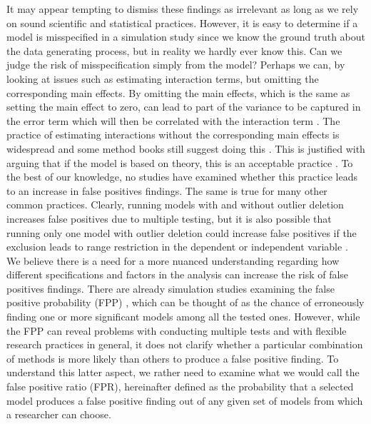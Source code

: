 It may appear tempting to dismiss these findings as irrelevant as long as we rely on sound scientific and statistical practices. However, it is easy to determine if a model is misspecified in a simulation study since we know the ground truth about the data generating process, but in reality we hardly ever know this. Can we judge the risk of misspecification simply from the model? Perhaps we can, by looking at issues such as estimating interaction terms, but omitting the corresponding main effects. By omitting the main effects, which is the same as setting the main effect to zero, can lead to part of the variance to be captured in the error term which will then be correlated with the interaction term \citep{Branbor2006}. The practice of estimating interactions without the corresponding main effects is widespread \citep{Branbor2006} and some method books still suggest doing this \citep{Cleves2008}. This is justified with arguing that if the model is based on theory, this is an acceptable practice \citep{aiken1991multiple}. To the best of our knowledge, no studies have examined whether this practice leads to an increase in false positives findings. The same is true for many other common practices. Clearly, running models with and without outlier deletion increases false positives due to multiple testing, but it is also possible that running only one model with outlier deletion could increase false positives if the exclusion leads to range restriction in the dependent or independent variable \citep{Raju2003}. \\        

We believe there is a need for a more nuanced understanding regarding how different specifications and factors in the analysis can increase the risk of false positives findings. There are already simulation studies examining the false positive probability (FPP) \citep{Simmons2011}, which can be thought of as the chance of erroneously finding one or more significant models among all the tested ones. However, while the FPP can reveal problems with conducting multiple tests and with flexible research practices in general, it does not clarify whether a particular combination of methods is more likely than others to produce a false positive finding. To understand this latter aspect, we rather need to examine what we would call the false positive ratio (FPR), hereinafter defined as the probability that a selected model produces a false positive finding out of any given set of models from which a researcher can choose. \\

